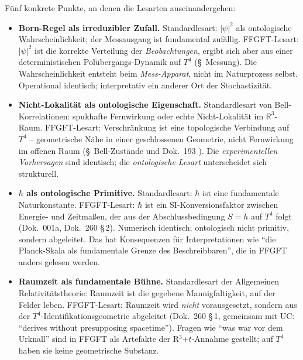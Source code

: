 F\"unf konkrete Punkte, an denen die Lesarten auseinandergehen:

\begin{itemize}[leftmargin=2em,itemsep=4pt,topsep=4pt]
  \item \textbf{Born-Regel als irreduzibler Zufall.}
        Standardlesart: $|\psi|^2$ als ontologische
        Wahrscheinlichkeit; der Messausgang ist fundamental
        zuf\"allig. FFGFT-Lesart: $|\psi|^2$ ist die korrekte
        Verteilung der \emph{Beobachtungen}, ergibt sich aber aus
        einer deterministischen Polübergangs-Dynamik auf $T^4$
        (§~Messung). Die Wahrscheinlichkeit entsteht beim
        \emph{Mess-Apparat}, nicht im Naturprozess selbst. Operational
        identisch; interpretativ ein anderer Ort der Stochastizit\"at.

  \item \textbf{Nicht-Lokalit\"at als ontologische Eigenschaft.}
        Standardlesart von Bell-Korrelationen: spukhafte Fernwirkung
        oder echte Nicht-Lokalit\"at im $\mathbb{R}^3$-Raum.
        FFGFT-Lesart: Verschr\"ankung ist eine topologische Verbindung
        auf $T^4$ -- geometrische N\"ahe in einer geschlossenen
        Geometrie, nicht Fernwirkung im offenen Raum (§~Bell-Zust\"ande
        und Dok.~193 \cite{pascher_nonclosure_2026}). Die
        \emph{experimentellen Vorhersagen} sind identisch; die
        \emph{ontologische Lesart} unterscheidet sich strukturell.

  \item \textbf{$\hbar$ als ontologische Primitive.}
        Standardlesart: $\hbar$ ist eine fundamentale Naturkonstante.
        FFGFT-Lesart: $\hbar$ ist ein SI-Konversionsfaktor zwischen
        Energie- und Zeitma\ss en, der aus der Abschlussbedingung
        $S=h$ auf $T^4$ folgt (Dok.~001a, Dok.~260 §\,2). Numerisch
        identisch; ontologisch nicht primitiv, sondern abgeleitet. Das
        hat Konsequenzen f\"ur Interpretationen wie \enquote{die
        Planck-Skala als fundamentale Grenze des Beschreibbaren}, die
        in FFGFT anders gelesen werden.

  \item \textbf{Raumzeit als fundamentale B\"uhne.}
        Standardlesart der Allgemeinen Relativit\"atstheorie:
        Raumzeit ist die gegebene Mannigfaltigkeit, auf der Felder
        leben. FFGFT-Lesart: Raumzeit wird \emph{nicht} vorausgesetzt,
        sondern aus der $T^4$-Identifikationsgeometrie abgeleitet
        (Dok.~260 §\,1, gemeinsam mit UC: \enquote{derives without
        presupposing spacetime}). Fragen wie \enquote{was war vor dem
        Urknall} sind in FFGFT als Artefakte der R$^3$+$t$-Annahme
        gestellt; auf $T^4$ haben sie keine geometrische Substanz.


\end{itemize}

